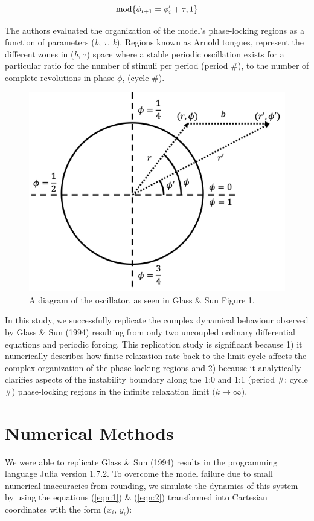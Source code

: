 \begin{equation}
    \textnormal{mod} \{\phi_{i+1} = \phi_i' + \tau,1\}
    \label{eqn:2}
\end{equation}

The authors evaluated the organization of the model’s phase-locking regions as a function of parameters (\emph{b}, $\tau$, \emph{k}). Regions known as Arnold tongues, represent the different zones in (\emph{b}, $\tau$) space where a stable periodic oscillation exists for a particular ratio for the number of stimuli per period (period \#), to the number of complete revolutions in phase $\phi$, (cycle \#).

\begin{figure}[hbt!]
    \begin{center}
    \includegraphics[width=.7\textwidth]{figures/Fig1.png}
    \end{center}
    \caption{A diagram of the oscillator, as seen in Glass \& Sun \cite{GLASS1994} Figure 1.}
    \label{osc}
\end{figure}

\indent In this study, we successfully replicate the complex dynamical behaviour observed by Glass \& Sun (1994)\supercite{GLASS1994} resulting from only two uncoupled ordinary differential equations and periodic forcing. This replication study is significant because 1) it numerically describes how finite relaxation rate back to the limit cycle affects the complex organization of the phase-locking regions and 2) because it analytically clarifies aspects of the instability boundary along the 1:0 and 1:1 (period \#: cycle \#) phase-locking regions in the infinite relaxation limit $(k \xrightarrow{} \infty$).

\section{Numerical Methods}
\indent We were able to replicate Glass \& Sun (1994)\supercite{GLASS1994} results in the programming language Julia version 1.7.2.
To overcome the model failure due to small numerical inaccuracies from rounding, we simulate the dynamics of this system by using the equations (\ref{eqn:1}) \& (\ref{eqn:2}) transformed into Cartesian coordinates with the form ($x_i$, $y_i$)\supercite{Glass2017}:

